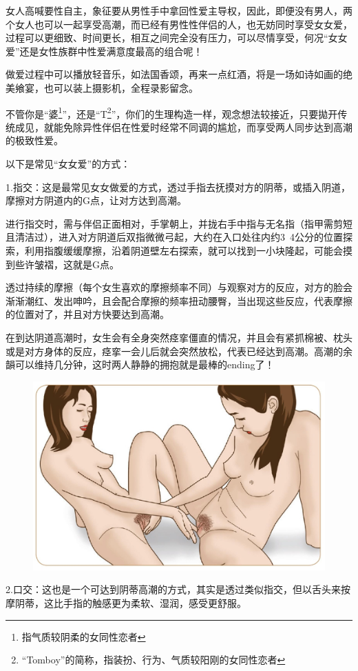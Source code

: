 \documentclass[12pt,UTF8]{ctexbook}
\begin{document}
女人高喊要性自主，象征要从男性手中拿回性爱主导权，因此，即便没有男人，两个女人也可以一起享受高潮，而已经有男性性伴侣的人，也无妨同时享受女女爱，过程可以更细致、时间更长，相互之间完全没有压力，可以尽情享受，何况“女女爱”还是女性族群中性爱满意度最高的组合呢！

做爱过程中可以播放轻音乐，如法国香颂，再来一点红酒，将是一场如诗如画的绝美飨宴，也可以装上摄影机，全程录影留念。

不管你是“婆\footnote{指气质较阴柔的女同性恋者}”，还是“T\footnote{“Tomboy”的简称，指装扮、行为、气质较阳刚的女同性恋者}”，你们的生理构造一样，观念想法较接近，只要拋开传统成见，就能免除异性伴侣在性爱时经常不同调的尴尬，而享受两人同步达到高潮的极致性爱。

以下是常见“女女爱”的方式：

1.指交：这是最常见女女做爱的方式，透过手指去抚摸对方的阴蒂，或插入阴道，摩擦对方阴道内的G点，让对方达到高潮。

进行指交时，需与伴侣正面相对，手掌朝上，并拢右手中指与无名指（指甲需剪短且清洁过），进入对方阴道后双指微微弓起，大约在入口处往内约3~4公分的位置探索，利用指腹缓缓摩擦，沿着阴道壁左右探索，就可以找到一小块隆起，可能会摸到些许皱褶，这就是G点。

透过持续的摩擦（每个女生喜欢的摩擦频率不同）与观察对方的反应，对方的脸会渐渐潮红、发出呻吟，且会配合摩擦的频率扭动腰臀，当出现这些反应，代表摩擦的位置对了，并且对方快要达到高潮。

在到达阴道高潮时，女生会有全身突然痉挛僵直的情况，并且会有紧抓棉被、枕头或是对方身体的反应，痉挛一会儿后就会突然放松，代表已经达到高潮。高潮的余韻可以维持几分钟，这时两人静静的拥抱就是最棒的ending了！

\begin{figure}[H]
	\centering
	\includegraphics[width=0.7\linewidth]{10}
	\caption{}
	\label{fig:1}
\end{figure}

2.口交：这也是一个可达到阴蒂高潮的方式，其实是透过类似指交，但以舌头来按摩阴蒂，这比手指的触感更为柔软、湿润，感受更舒服。
\end{document}
